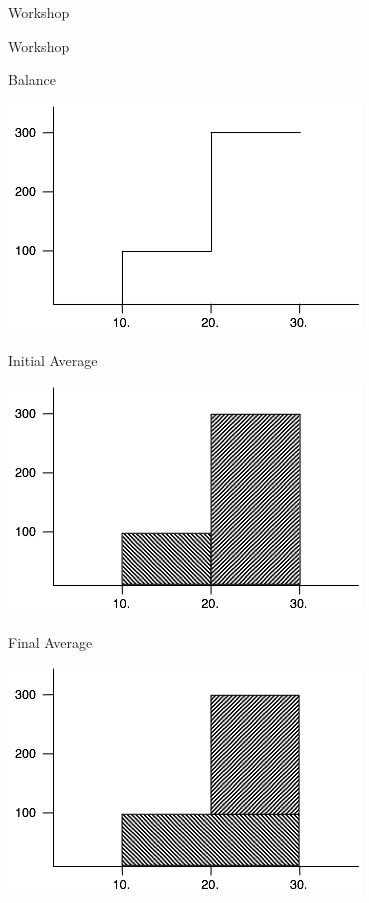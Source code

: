 \begin{frame}[fragile]{Workshop}

\begin{center}
{\huge Workshop}
\end{center}
\end{frame}

\begin{frame}[fragile]{Balance}
\begin{center}
\includegraphics[width=.85 \paperwidth]{../workshopMaterial/balance.jpg}
\end{center}
\end{frame}

\begin{frame}[fragile]{Initial Average}
\begin{center}
\includegraphics[width=.85 \paperwidth]{../workshopMaterial/initialAverage.jpg}
\end{center}
\end{frame}

\begin{frame}[fragile]{Final Average}
\begin{center}
\includegraphics[width=.85 \paperwidth]{../workshopMaterial/finalAverage.jpg}
\end{center}
\end{frame}

